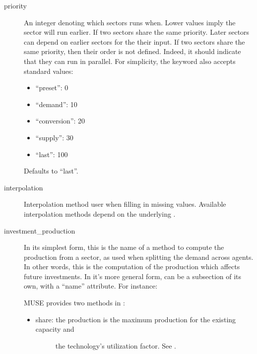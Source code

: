 \documentclass[letterpaper,10pt,english]{sphinxmanual}
\begin{document}
\label{\detokenize{inputs/toml:sector-priority}}\begin{description}
\item[{priority}] \leavevmode
An integer denoting which sectors runs when. Lower values imply the sector will run
earlier. If two sectors share the same priority. Later sectors can depend on earlier
sectors for the their input. If two sectors share the same priority, then their
order is not defined. Indeed, it should indicate that they can run in parallel.
For simplicity, the keyword also accepts standard values:
\begin{itemize}
\item {} 
“preset”: 0

\item {} 
“demand”: 10

\item {} 
“conversion”: 20

\item {} 
“supply”: 30

\item {} 
“last”: 100

\end{itemize}

Defaults to “last”.

\item[{interpolation}] \leavevmode
Interpolation method user when filling in missing values. Available interpolation
methods depend on the underlying .

\item[{investment\_production}] \leavevmode
In its simplest form, this is the name of a method to compute the production from a
sector, as used when splitting the demand across agents. In other words, this is the
computation of the production which affects future investments. In it’s more general
form,  can be a subsection of its own, with a “name” attribute. For
instance:

\begin{sphinxVerbatim}[commandchars=\\\{\}]
  
  
\end{sphinxVerbatim}

MUSE provides two methods in :
\begin{itemize}
\item {} \begin{description}
\item[{share: the production is the maximum production for the existing capacity and}] \leavevmode
the technology’s utilization factor.
See .


\end{description}
\end{itemize}
\end{description}
\end{document}
